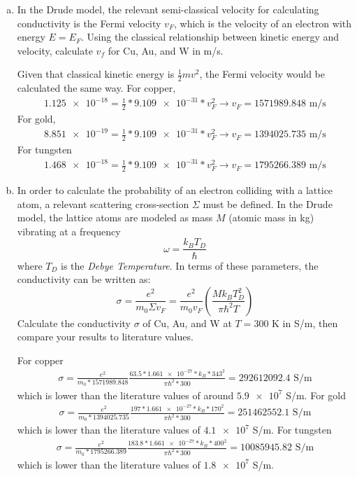 \documentclass[10pt,letterpaper]{article}
\begin{document}
\begin{enumerate}
\begin{enumerate}[a)]
\item In the Drude model, the relevant semi-classical velocity for calculating conductivity is the Fermi velocity $v_{F}$, which is the velocity of an electron with energy $E = E_{F}$. Using the classical relationship between kinetic energy and velocity, calculate $v_{f}$ for Cu, Au, and W in m/s. 

\color{violet}
Given that classical kinetic energy is $\frac{1}{2}mv^{2}$, the Fermi velocity would be calculated the same way. For copper,
\begin{gather*}
\num{1.125e-18} = \frac{1}{2} * \num{9.109e-31} * v_{F}^{2} \rightarrow v_{F} = 1571989.848\text{ m/s}
\end{gather*}
For gold,
\begin{gather*}
\num{8.851e-19} = \frac{1}{2} * \num{9.109e-31} * v_{F}^{2} \rightarrow v_{F} = 1394025.735\text{ m/s}
\end{gather*}
For tungsten
\begin{gather*}
\num{1.468e-18} = \frac{1}{2} * \num{9.109e-31} * v_{F}^{2} \rightarrow v_{F} = 1795266.389\text{ m/s}
\end{gather*}
\color{black}

\item In order to calculate the probability of an electron colliding with a lattice atom, a relevant scattering cross-section $\Sigma$  must be defined. In the Drude model, the lattice atoms are modeled as mass $M$ (atomic mass in kg) vibrating at a frequency
$$\omega = \frac{k_{B}T_{D}}{\hbar}$$
where $T_{D}$ is the \textit{Debye Temperature}. In terms of these parameters, the conductivity can be written as:
$$\sigma = \frac{e^{2}}{m_{0}\Sigma v_{F}} = \frac{e^{2}}{m_{0}v_{F}}\left( \frac{Mk_{B}T_{D}^{2}}{\pi\hbar^{2}T} \right)$$
Calculate the conductivity $\sigma$ of Cu, Au, and W at $T = 300$ K in S/m, then compare your results to literature values. 

\color{violet}
For copper
\begin{gather*}
\sigma = \frac{e^{2}}{m_{0} * 1571989.848} \frac{63.5 * \num{1.661e-27} * k_{B} * 343^{2}}{\pi\hbar^{2} * 300} = 292612092.4\text{ S/m}
\end{gather*}
which is lower than the literature values of around $\num{5.9e7}$ S/m. For gold
\begin{gather*}
\sigma = \frac{e^{2}}{m_{0} * 1394025.735} \frac{197 * \num{1.661e-27} * k_{B} * 170^{2}}{\pi\hbar^{2} * 300} = 251462552.1\text{ S/m}
\end{gather*}
which is lower than the literature values of $\num{4.1e7}$ S/m. For tungsten
\begin{gather*}
\sigma = \frac{e^{2}}{m_{0} * 1795266.389} \frac{183.8 * \num{1.661e-27} * k_{B} * 400^{2}}{\pi\hbar^{2} * 300} = 10085945.82\text{ S/m}
\end{gather*}
which is lower than the literature values of $\num{1.8e7}$ S/m. 
\color{black}


\end{enumerate}
\end{enumerate}
\end{document}
